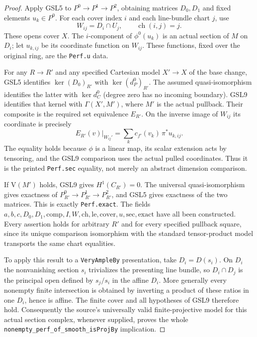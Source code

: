 \documentclass[11pt,a4paper]{article}
\numberwithin{equation}{section}
\theoremstyle{remark}\newtheorem{remark}[theorem]{Remark}
\begin{document}
\begin{proof}
Apply GSL5 to $P^0\to P^1\to P^2$, obtaining matrices
$D_0,D_1$ and fixed elements $u_k\in P^0$.  For each cover index
$i$ and each line-bundle chart $j$, use
\[
 W_{ij}=D_i\cap U_j,\qquad \operatorname{ch}(i,j)=j.
\]
These opens cover $X$.  The $i$-component of $\phi^0(u_k)$ is
an actual section of $M$ on $D_i$; let $u_{k,ij}$ be its coordinate
function on $W_{ij}$.  These functions, fixed over the original
ring, are the \texttt{Perf.\allowbreak u} data.

For any $R\to R'$ and any specified Cartesian model
$X'\to X$ of the base change, GSL5 identifies
$\ker(D_0)_{R'}$ with $\ker(d_P^0)_{R'}$.  The assumed
quasi-isomorphism identifies the latter with $\ker d_C^0$
(degree zero has no incoming boundary).  GSL9 identifies that kernel
with $\Gamma(X',M')$, where $M'$ is the actual pullback.  Their
composite is the required set equivalence $E_{R'}$.  On the inverse
image of $W_{ij}$ its coordinate is precisely
\[
 E_{R'}(v)|_{W_{ij}'}
   =\sum_k c_{f'}(v_k)\,\pi^*u_{k,ij}. \tag{GSL.6}
\]
The equality holds because $\phi$ is a linear map, its scalar
extension acts by tensoring, and the GSL9 comparison uses the
actual pulled coordinates.  Thus it is the printed
\texttt{Perf.\allowbreak sec} equality, not merely an abstract dimension
comparison.

If $\mathrm V(M')$ holds, GSL9 gives $H^1(C_{R'})=0$.
The universal quasi-isomorphism gives exactness of
$P^0_{R'}\to P^1_{R'}\to P^2_{R'}$, and GSL5 gives exactness
of the two matrices.  This is exactly \texttt{Perf.\allowbreak exact}.
The fields $a,b,c,D_0,D_1,\mathrm{comp},I,W,\mathrm{ch},
\mathrm{le},\mathrm{cover},u,\mathrm{sec},\mathrm{exact}$ have
all been constructed.  Every assertion holds for arbitrary $R'$ and
for every specified pullback square, since its unique comparison
isomorphism with the standard tensor-product model transports the
same chart equalities.

To apply this result to a \texttt{Very\allowbreak Ample\allowbreak By} presentation,
take $D_i=D(s_i)$.  On $D_i$ the nonvanishing section $s_i$
trivializes the presenting line bundle, so
$D_i\cap D_j$ is the principal open defined by $s_j/s_i$ in
the affine $D_i$.  More generally every nonempty finite
intersection is obtained by inverting a product of these
ratios in one $D_i$, hence is affine.  The finite cover and
all hypotheses of GSL9 therefore hold.  Consequently the
source's universally valid finite-projective model for this
actual section complex, whenever supplied, proves the whole
\texttt{nonempty\_\allowbreak perf\_\allowbreak of\_\allowbreak smooth\_\allowbreak is\allowbreak Proj\allowbreak By} implication.
\end{proof}
\end{document}
